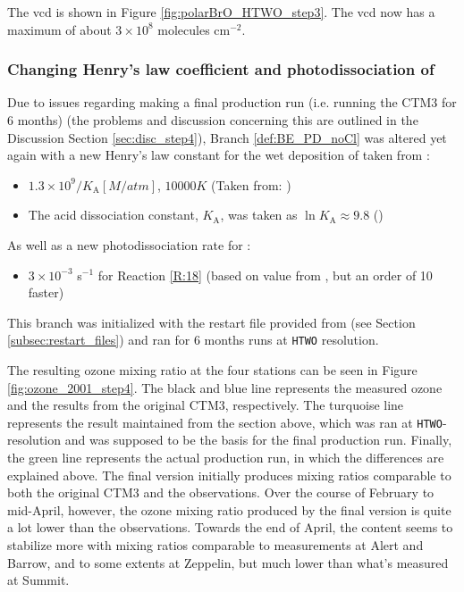 \medskip

The  \acrshort{vcd} is shown in Figure \ref{fig:polarBrO_HTWO_step3}. The  \acrshort{vcd} now has a maximum of about $3\times10^8$ molecules cm$^{-2}$. 

\subsubsection{Changing Henry's law coefficient and photodissociation of }\label{sec:res_step4}

Due to issues regarding making a final production run (i.e. running the CTM3 for 6 months) (the problems and discussion concerning this are outlined in the Discussion Section \ref{sec:disc_step4}), Branch \ref{def:BE_PD_noCl} was altered yet again with a new Henry's law constant for the wet deposition of  taken from \cite{Sander99}: 

\begin{itemize}
    \item $1.3\times10^9/K_\text{A} [M/atm]$, $10 000 K$ (Taken from: \cite{Brimblecombe1988TheSA})
    \item The acid dissociation constant, $K_\text{A}$, was taken as $\ln{K_\text{A}} \approx 9.8$ (\cite{Levanov})
\end{itemize}

As well as a new photodissociation rate for :

\begin{itemize}
    \item $3\times10^{-3}$ s$^{-1}$ for Reaction \ref{R:18} (based on value from \cite{CAO}, but an order of 10 faster)
\end{itemize}

This branch was initialized with the restart file provided from \cite{StefaniePersonal} (see Section \ref{subsec:restart_files}) and ran for 6 months runs at \texttt{HTWO} resolution. 

\medskip

The resulting ozone mixing ratio at the four stations can be seen in Figure \ref{fig:ozone_2001_step4}. The black and blue line represents the measured ozone and the results from the original CTM3, respectively. The turquoise line represents the result maintained from the section above, which was ran at \texttt{HTWO}-resolution and was supposed to be the basis for the final production run. Finally, the green line represents the actual production run, in which the differences are explained above. The final version initially produces mixing ratios comparable to both the original CTM3 and the observations. Over the course of February to mid-April, however, the ozone mixing ratio produced by the final version is quite a lot lower than the observations. Towards the end of April, the content seems to stabilize more with mixing ratios comparable to measurements at Alert and Barrow, and to some extents at Zeppelin, but much lower than what's measured at Summit. 


